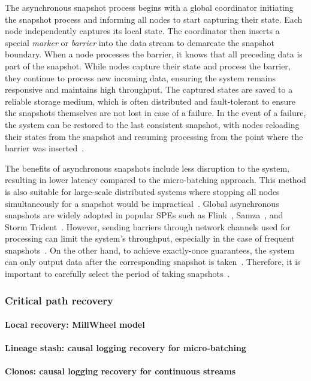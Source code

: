 The asynchronous snapshot process begins with a global coordinator initiating the snapshot process and informing all nodes to start capturing their state. Each node independently captures its local state. The coordinator then inserts a special {\em marker} or {\em barrier} into the data stream to demarcate the snapshot boundary. When a node processes the barrier, it knows that all preceding data is part of the snapshot. While nodes capture their state and process the barrier, they continue to process new incoming data, ensuring the system remains responsive and maintains high throughput. The captured states are saved to a reliable storage medium, which is often distributed and fault-tolerant to ensure the snapshots themselves are not lost in case of a failure. In the event of a failure, the system can be restored to the last consistent snapshot, with nodes reloading their states from the snapshot and resuming processing from the point where the barrier was inserted~\cite{2015arXiv150608603C, Carbone:2017:SMA:3137765.3137777}.

The benefits of asynchronous snapshots include less disruption to the system, resulting in lower latency compared to the micro-batching approach. This method is also suitable for large-scale distributed systems where stopping all nodes simultaneously for a snapshot would be impractical~\cite{carbone2018scalable}. Global asynchronous snapshots are widely adopted in popular SPEs such as Flink~\cite{carbone2015apache}, Samza~\cite{Noghabi:2017:SSS:3137765.3137770}, and Storm Trident~\cite{apache:storm:trident}. However, sending barriers through network channels used for processing can limit the system's throughput, especially in the case of frequent snapshots~\cite{DBLP:journals/pvldb/BegoliACHKKMS21, trofimov2023bounding}. On the other hand, to achieve exactly-once guarantees, the system can only output data after the corresponding snapshot is taken~\cite{silvestre2021clonos, thepaper}. Therefore, it is important to carefully select the period of taking snapshots~\cite{thepaper}.

\subsubsection{Critical path recovery}
\label{phd-related-critical-path-recovery}

\paragraph{Local recovery: MillWheel model}

\paragraph{Lineage stash: causal logging recovery for micro-batching}

\paragraph{Clonos: causal logging recovery for continuous streams}

